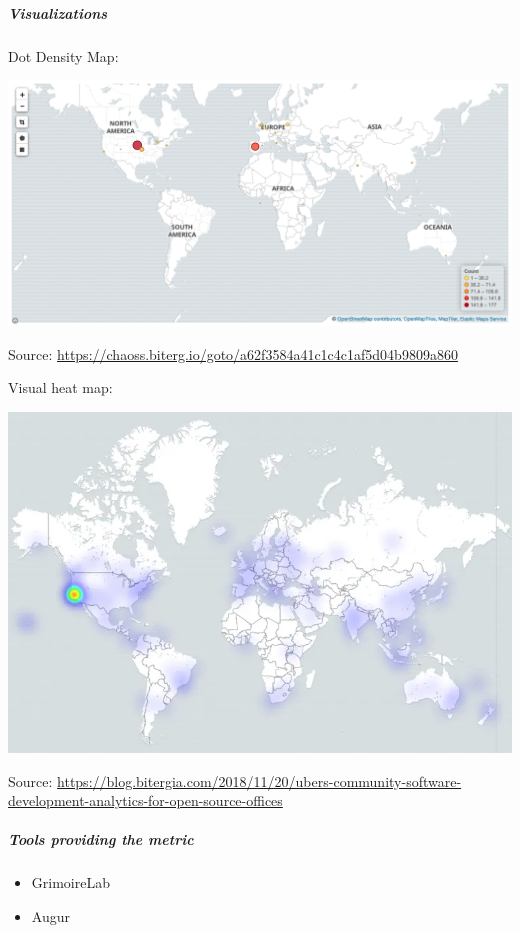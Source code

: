 \hypertarget{visualizations}{%
\subparagraph{Visualizations}\label{visualizations}}

Dot Density Map:

\includegraphics{images/contributor-location_dot-density-map.png}

Source:
\href{https://chaoss.biterg.io/goto/a62f3584a41c1c4c1af5d04b9809a860}{\url{https://chaoss.biterg.io/goto/a62f3584a41c1c4c1af5d04b9809a860}}

Visual heat map:

\includegraphics{images/contributor-location_heatmap.png}

Source:
\href{https://blog.bitergia.com/2018/11/20/ubers-community-software-development-analytics-for-open-source-offices}{\url{https://blog.bitergia.com/2018/11/20/ubers-community-software-development-analytics-for-open-source-offices}}

\hypertarget{tools-providing-the-metric}{%
\subparagraph{Tools providing the
metric}\label{tools-providing-the-metric}}

\begin{itemize}
\tightlist
\item
  GrimoireLab
\item
  Augur
\end{itemize}

